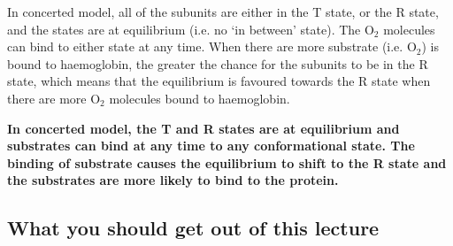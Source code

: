 In concerted model, all of the subunits are either in the T state, or the R state, and the states are at equilibrium (i.e. no `in between' state).
The O$_2$ molecules can bind to either state at any time.
When there are more substrate (i.e. O$_2$) is bound to haemoglobin, the greater the chance for the subunits to be in the R state, which means that the equilibrium is favoured towards the R state when there are more O$_2$ molecules bound to haemoglobin.

\textbf{ In concerted model, the T and R states are at equilibrium and substrates can bind at any time to any conformational state. The binding of substrate causes the equilibrium to shift to the R state and the substrates are more likely to bind to the protein.}

\begin{center}
\end{center}

\subsection*{What you should get out of this lecture}

